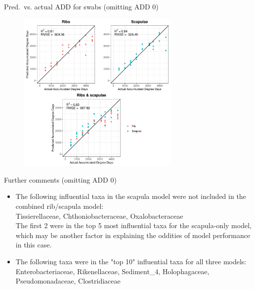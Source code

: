 \documentclass{beamer}
\begin{document}
\begin{frame}{Pred.\ vs. actual ADD for swabs (omitting ADD 0)}

  \begin{center}
    \begin{figure}
      \includegraphics[height=3.1in]
        {w_swabs/bacteria/use_families/hl_combined_family_no_baseline_predicted_vs_actual_ADD}
    \end{figure}
  \end{center}
    
\end{frame}



\begin{frame}{Further comments (omitting ADD 0)}
  
  \begin{itemize}
    \item The following influential taxa in the scapula model were not included
    in the combined rib/scapula model:\\
    Tissierellaceae, Chthoniobacteraceae, Oxalobacteraceae\\
    The first 2 were in the top 5 most influential taxa for the scapula-only
    model, which may be another factor in explaining the oddities of model
    performance in this case.
    \item The following taxa were in the "top 10" influential taxa for all
    three models:\\
    Enterobacteriaceae, Rikenellaceae, Sediment\_4, Holophagaceae,
    Pseudomonadaceae, Clostridiaceae
    
  \end{itemize}

\end{frame}
\end{document}
